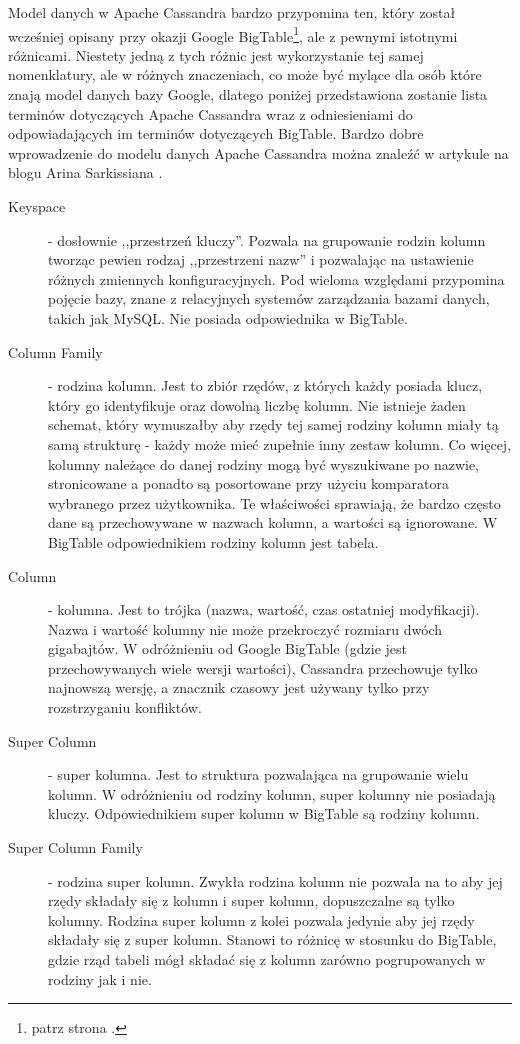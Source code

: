 Model danych w Apache Cassandra bardzo przypomina ten, który został wcześniej opisany przy okazji Google BigTable\footnote{patrz strona \pageref{google-bigtable-model-danych}.}, ale z pewnymi istotnymi różnicami.
Niestety jedną z tych różnic jest wykorzystanie tej samej nomenklatury, ale w różnych znaczeniach, co może być mylące dla osób które znają model danych bazy Google, dlatego poniżej przedstawiona zostanie lista terminów dotyczących Apache Cassandra wraz z odniesieniami do odpowiadających im terminów dotyczących BigTable.
Bardzo dobre wprowadzenie do modelu danych Apache Cassandra można znaleźć w artykule na blogu Arina Sarkissiana \cite{arin-wtf-is-a-supercolumn}.

\begin{description}
 \item[Keyspace] - dosłownie ,,przestrzeń kluczy''.
 Pozwala na grupowanie rodzin kolumn tworząc pewien rodzaj ,,przestrzeni nazw'' i pozwalając na ustawienie różnych zmiennych konfiguracyjnych.
 Pod wieloma względami przypomina pojęcie bazy, znane z relacyjnych systemów zarządzania bazami danych, takich jak MySQL.
 Nie posiada odpowiednika w BigTable.

 \item[Column Family] - rodzina kolumn.
 Jest to zbiór rzędów, z których każdy posiada klucz, który go identyfikuje oraz dowolną liczbę kolumn.
 Nie istnieje żaden schemat, który wymuszałby aby rzędy tej samej rodziny kolumn miały tą samą strukturę - każdy może mieć zupełnie inny zestaw kolumn.
 Co więcej, kolumny należące do danej rodziny mogą być wyszukiwane po nazwie, stronicowane a ponadto są posortowane przy użyciu komparatora wybranego przez użytkownika.
 Te właściwości sprawiają, że bardzo często dane są przechowywane w nazwach kolumn, a wartości są ignorowane.
 W BigTable odpowiednikiem rodziny kolumn jest tabela.

 \item[Column] - kolumna.
 Jest to trójka (nazwa, wartość, czas ostatniej modyfikacji).
 Nazwa i wartość kolumny nie może przekroczyć rozmiaru dwóch gigabajtów.
 W odróżnieniu od Google BigTable (gdzie jest przechowywanych wiele wersji wartości), Cassandra przechowuje tylko najnowszą wersję, a znacznik czasowy jest używany tylko przy rozstrzyganiu konfliktów.

 \item[Super Column] - super kolumna.
 Jest to struktura pozwalająca na grupowanie wielu kolumn.
 W odróżnieniu od rodziny kolumn, super kolumny nie posiadają kluczy.
 Odpowiednikiem super kolumn w BigTable są rodziny kolumn.

 \item[Super Column Family] - rodzina super kolumn.
 Zwykła rodzina kolumn nie pozwala na to aby jej rzędy składały się z kolumn i super kolumn, dopuszczalne są tylko kolumny.
 Rodzina super kolumn z kolei pozwala jedynie aby jej rzędy składały się z super kolumn.
 Stanowi to różnicę w stosunku do BigTable, gdzie rząd tabeli mógł składać się z kolumn zarówno pogrupowanych w rodziny jak i nie.
\end{description}

